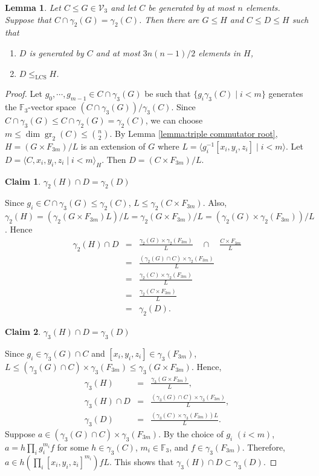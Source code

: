 \documentclass[11pt,reqno]{article}
\newtheorem{lemma}[theorem]{Lemma}
\newtheorem{claim}{Claim}[theorem]
\theoremstyle{definition}
\theoremstyle{remark}
\DeclareMathOperator{\gr}{gr}
\newcommand{\LCS}{\mathrm{LCS}}
\begin{document}
\begin{lemma}\label{lemma:number of generators for triple commutator roots}
    Let $C\leq G\in\mathcal V_3$ and let $C$ be generated by at most $n$ elements.
    Suppose that $C\cap \gamma_2(G)=\gamma_2(C)$.
    Then there are $G\leq H$ and $C\leq D\leq H$ such that
    \begin{enumerate}
        \item $D$ is generated by $C$ and at most $3n(n-1)/2$ elements in $H$,
        \item $D\leq_\LCS H$.
    \end{enumerate}
\end{lemma}
\begin{proof}
    Let $g_0,\cdots, g_{m-1} \in C\cap \gamma_3(G)$ be such that $\{g_i\gamma_3(C)\mid i< m\}$ generates the $\mathbb F_3$-vector space $(C\cap \gamma_3(G))/\gamma_3(C)$.
    Since $C\cap \gamma_3(G)\leq C\cap\gamma_2(G)=\gamma_2(C)$, we can choose $m\leq \dim\gr_2(C)\leq \binom n2$.
    By Lemma \ref{lemma:triple commutator root}, $H=(G\times F_{3m})/L$ is an extension of $G$  where $L=\langle g_i^{-1}[x_i,y_i,z_i]\mid i< m\rangle$.
    Let $D=\langle C,x_i,y_i,z_i\mid i< m\rangle_H$. Then $D=(C\times F_{3m})/L$.
    \begin{claim}
        $\gamma_2(H)\cap D=\gamma_2(D)$
    \end{claim}
    Since $g_i\in C\cap \gamma_3(G)\leq \gamma_2(C)$, $L\leq \gamma_2(C\times F_{3m})$.
    Also, $\gamma_2(H)=(\gamma_2(G\times F_{3m})L)/L=\gamma_2(G\times F_{3m})/L=(\gamma_2(G)\times \gamma_2(F_{3m}))/L$.
    Hence
    \begin{eqnarray*}
        \gamma_2(H)\cap D 
        &=& \frac{\gamma_2(G)\times \gamma_2(F_{3m})}L \quad \cap \quad   \frac{C\times F_{3m}}L \\ 
        &=& \frac{(\gamma_2(G)\cap C)\times \gamma_2(F_{3m})}L \\ 
        &=& \frac{\gamma_2(C)\times \gamma_2(F_{3m})}L \\
        &=& \frac{\gamma_2(C\times F_{3m})}L \\ 
        &=& \gamma_2(D).
    \end{eqnarray*}
    \begin{claim}
        $\gamma_3(H)\cap D=\gamma_3(D)$
    \end{claim}
    Since $g_i\in \gamma_3(G)\cap C$ and $[x_i,y_i,z_i]\in \gamma_3(F_{3m})$, $L\leq (\gamma_3(G)\cap C)\times \gamma_3(F_{3m})\leq \gamma_3(G\times F_{3m})$.
    Hence,
    \begin{eqnarray*}
        \gamma_3(H) &=& \frac{\gamma_3(G\times F_{3m})}L, \\ 
        \gamma_3(H) \cap D &=& \frac{(\gamma_3(G)\cap C)\times\gamma_3(F_{3m})}L,\\ 
        \gamma_3(D)&=&\frac{(\gamma_3(C)\times \gamma_3(F_{3m}))L}L.
    \end{eqnarray*}
    Suppose $a\in (\gamma_3(G)\cap C)\times \gamma_3(F_{3m})$.
    By the choice of $g_i$ $(i<m)$, $a=h\prod_i g_i^{m_i} f$ for some $h\in \gamma_3(C)$, $m_i\in\mathbb F_3$, and $f\in\gamma_3(F_{3m})$.
    Therefore, $a\in h(\prod_i [x_i,y_i,z_i]^{m_i})f L$.
    This shows that $\gamma_3(H)\cap D\subset \gamma_3(D)$.
\end{proof}
\end{document}
